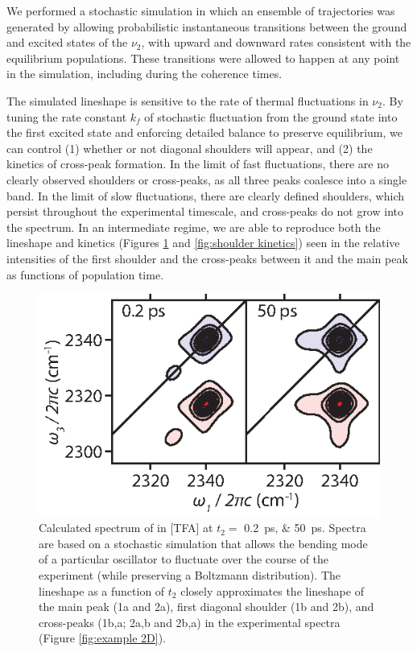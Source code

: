 We performed a stochastic simulation in which an ensemble of trajectories was generated by allowing probabilistic instantaneous transitions between the ground and excited states of the $\nu_2$, with upward and downward rates consistent with the equilibrium populations. These transitions were allowed to happen at any point in the simulation, including during the coherence times.

The simulated lineshape is sensitive to the rate of thermal fluctuations in $\nu_2$. By tuning the rate constant $k_f$ of stochastic fluctuation from the ground state into the first excited state and enforcing detailed balance to preserve equilibrium, we can control (1) whether or not diagonal shoulders will appear, and (2) the kinetics of cross-peak formation. In the limit of fast fluctuations, there are no clearly observed shoulders or cross-peaks, as all three peaks coalesce into a single band. In the limit of slow fluctuations, there are clearly defined shoulders, which persist throughout the experimental timescale, and cross-peaks do not grow into the spectrum. In an intermediate regime, we are able to reproduce both the lineshape and kinetics (Figures \ref{fig:sim spect} and \ref{fig:shoulder kinetics}) seen in the relative intensities of the first shoulder and the cross-peaks between it and the main peak  as functions of population time.

\begin{figure}
\includegraphics[scale = 1]{./anions/fig9.eps}
\caption[Stochastic simulation spectrum]{\label{fig:sim spect}Calculated spectrum of  in \ce{[Im_{4,1}]}[TFA] at $t_2 =$ \SIlist[list-units = single]{0.2;50}{\ps}. Spectra are based on a stochastic simulation that allows the bending mode of a particular oscillator to fluctuate over the course of the experiment (while preserving a Boltzmann distribution). The lineshape as a function of $t_2$ closely approximates the lineshape of the main peak (1a and 2a), first diagonal shoulder (1b and 2b), and cross-peaks (1b,a; 2a,b and 2b,a) in the experimental spectra (Figure {\ref{fig:example 2D}}).}
\end{figure}

